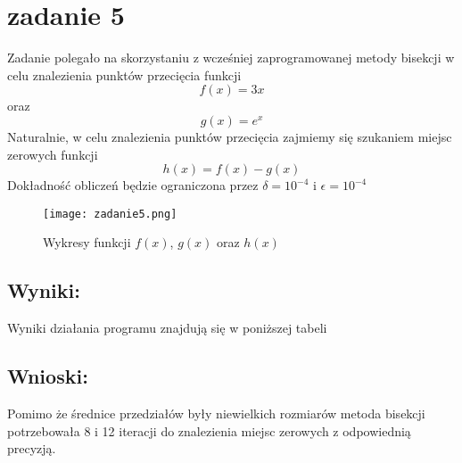 \section{zadanie 5}
Zadanie polegało na skorzystaniu z wcześniej zaprogramowanej metody bisekcji w celu znalezienia punktów przecięcia funkcji \[f(x) = 3x\] oraz \[g(x) = e^x\]
Naturalnie, w celu znalezienia punktów przecięcia zajmiemy się szukaniem miejsc zerowych funkcji \[h(x) = f(x) - g(x)\]
Dokładność obliczeń będzie ograniczona przez \(\delta = 10^{-4}\) i \(\epsilon = 10^{-4}\)
\begin{figure}[ht]
  \centering
  \texttt{[image: zadanie5.png]}
  \caption{Wykresy funkcji \(f(x)\), \(g(x)\) oraz \(h(x)\)}
\end{figure}


\subsection{Wyniki:}
Wyniki działania programu znajdują się w poniższej tabeli
\begin{table}[ht]
    \caption{wartości z wyjścia programu \textbf{zadanie5.jl}}

\end{table}



\subsection{Wnioski:}
Pomimo że średnice przedziałów były niewielkich rozmiarów metoda bisekcji potrzebowała 8 i 12 iteracji do znalezienia miejsc zerowych z odpowiednią precyzją.